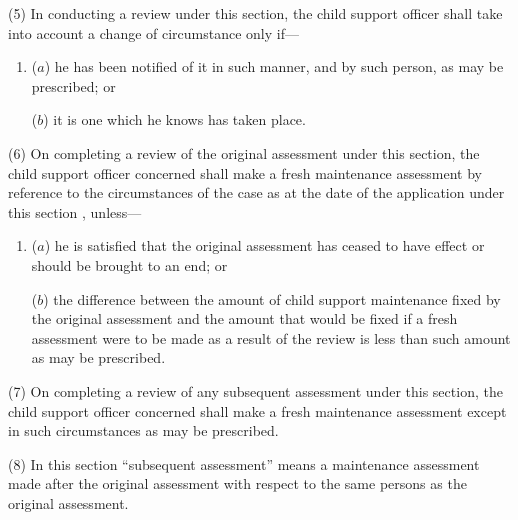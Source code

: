 \documentclass[12pt,a4paper]{article}
\begin{document}

(5) In conducting a review under this section, the child support officer shall take into account a change of circumstance only if—
\begin{enumerate}\item[]
($a$) he has been notified of it in such manner, and by such person, as may be prescribed; or

($b$) it is one which he knows has taken place.
\end{enumerate}

(6) On completing 
a review of the original assessment  %
under this section, the child support officer concerned shall make a fresh maintenance assessment
by reference to the circumstances of the case as at the date of the application under this section%
, unless—
\begin{enumerate}\item[]
($a$) he is satisfied that the original assessment has ceased to have effect or should be brought to an end; or

($b$) the difference between the amount of child support maintenance fixed by the original assessment and the amount that would be fixed if a fresh assessment were to be made as a result of the review is less than such amount as may be prescribed.
\end{enumerate}

(7) On completing a review of any subsequent assessment under this section, the child support officer concerned shall make a fresh maintenance assessment except in such circumstances as may be prescribed.

(8) In this section “subsequent assessment” means a maintenance assessment made after the original assessment with respect to the same persons as the original assessment.

\end{document}
